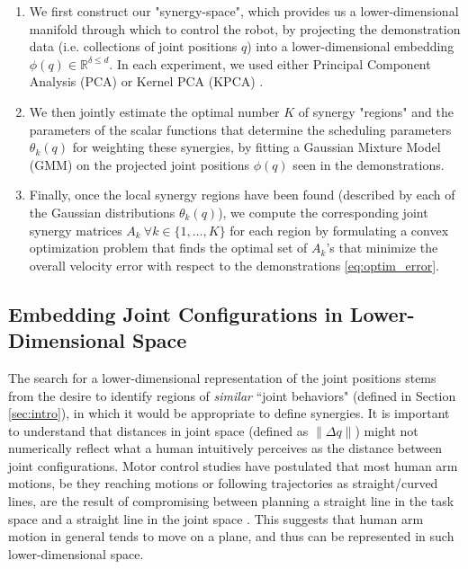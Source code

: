 \documentclass[letterpaper, 10 pt, conference,fleqn]{ieeeconf}
\begin{document}
\begin{enumerate}
\item We first construct our "synergy-space", which provides us a lower-dimensional manifold through which to control the robot, by projecting the demonstration data (i.e. collections of joint positions $q$) into a lower-dimensional embedding $\phi(q)\in \mathbb{R}^{\delta\leq d}$. In each experiment, we used either Principal Component Analysis (PCA) \cite{jolliffe1986pca} or Kernel PCA (KPCA) \cite{scholkopf1997kernel}.

\item We then jointly estimate the optimal number $K$ of synergy "regions" and the parameters of the scalar functions that determine the scheduling parameters $\theta_k(q)$ for weighting these synergies, by fitting a Gaussian Mixture Model (GMM) on the projected joint positions $\phi(q)$ seen in the demonstrations.

\item Finally, once the local synergy regions have been found (described by each of the Gaussian distributions $\theta_k(q)$), we compute the corresponding joint synergy matrices $A_k~\forall k\in\{1,\dots,K\}$ for each region by formulating a convex optimization problem that finds the optimal set of $A_k$'s that minimize the overall velocity error with respect to the demonstrations \eqref{eq:optim_error}.
\end{enumerate}

\subsection{Embedding Joint Configurations in Lower-Dimensional Space}



The search for a lower-dimensional representation of the joint positions stems from the desire to identify regions of \textit{similar} ``joint behaviors" (defined in Section \ref{sec:intro}), in which it would be appropriate to define synergies. It is important to understand that distances in joint space (defined as $\| \Delta q\|$) might not numerically reflect what a human intuitively perceives as the distance between joint configurations. Motor control studies have postulated that most human arm motions, be they reaching motions or following trajectories as straight/curved lines, are the result of compromising between planning a straight line in the task space and a straight line in the joint space \cite{Cruse1987humanarm,Okadome1999arm}. This suggests that human arm motion in general tends to move on a plane, and thus can be represented in such lower-dimensional space. 
\end{document}
